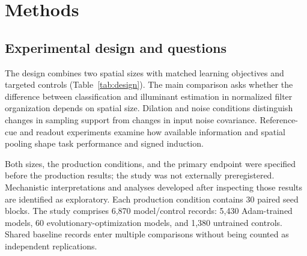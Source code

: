\documentclass[authoryear,preprint,review,12pt]{elsarticle}
\begin{document}
\section{Methods}\label{sec:methods}
\subsection{Experimental design and questions}
The design combines two spatial sizes with matched learning objectives and targeted controls (Table~\ref{tab:design}). The main comparison asks whether the difference between classification and illuminant estimation in normalized filter organization depends on spatial size. Dilation and noise conditions distinguish changes in sampling support from changes in input noise covariance. Reference-cue and readout experiments examine how available information and spatial pooling shape task performance and signed induction.

Both sizes, the production conditions, and the primary endpoint were specified before the production results; the study was not externally preregistered. Mechanistic interpretations and analyses developed after inspecting those results are identified as exploratory. Each production condition contains 30 paired seed blocks. The study comprises 6,870 model/control records: 5,430 Adam-trained models, 60 evolutionary-optimization models, and 1,380 untrained controls. Shared baseline records enter multiple comparisons without being counted as independent replications.
\end{document}
